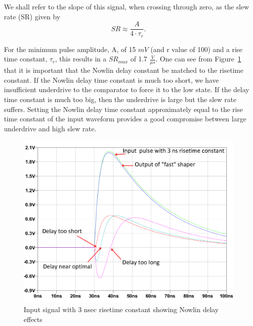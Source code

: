 \documentclass[12pt,oneside,final]{siuethesis}
\theoremstyle{definition}
\begin{document}
We shall refer to the slope of this signal, when crossing through zero, as the slew rate (SR) given by
\begin{equation}
SR \approx \frac{A}{4 \cdot \tau_r}.
\end{equation}

For the minimum pulse amplitude, A, of 15 $mV$ (and r value of 100) and a rise time constant, $\tau_r$, this results in a $SR_{max}$ of 1.7 $\frac{V}{\mu s}$. One can see from Figure~\ref{fig:nowlinout} that it is important that the Nowlin delay constant be matched to the risetime constant. If the Nowlin delay time constant is much too short, we have insufficient underdrive to the comparator to force it to the low state.  If the delay time constant is much too big, then the underdrive is large but the slew rate suffers. Setting the Nowlin delay time constant approximately equal to the rise time constant of the input waveform provides a good compromise between large underdrive and high slew rate.

\begin{figure}[htbp!]
\centering
\includegraphics[scale=.45,keepaspectratio=true]{./ch2_figures/nowlin.png} 
\caption{Input signal with 3 nsec risetime constant showing Nowlin delay effects}
\label{fig:nowlinout}
\end{figure}
\end{document}
